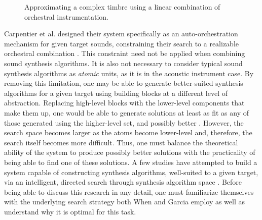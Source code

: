 \documentclass[a4paper,12pt]{report} 	%
\numberwithin{figure}{chapter}
\numberwithin{table}{chapter}
\numberwithin{equation}{chapter}
\begin{document}
\begin{flushleft}
\begin{figure}[h!]
\begin{center}
\caption[Searching for an Appropriate Linear Combination of Orchestral Instruments]{Approximating a complex timbre using a linear combination of orchestral instrumentation.}
\end{center}
\end{figure}
Carpentier et al. designed their system specifically as an auto-orchestration mechanism for given target sounds, constraining their search to a realizable orchestral combination \cite{Carpentier:2010fh}. This constraint need not be applied when combining sound synthesis algorithms. It is also not necessary to consider typical sound synthesis algorithms as \emph{atomic} units, as it is in the acoustic instrument case. By removing this limitation, one may be able to generate better-suited synthesis algorithms for a given target using building blocks at a different level of abstraction. Replacing high-level blocks with the lower-level components that make them up, one would be able to generate solutions at least as fit as any of those generated using the higher-level set, and possibly better \cite[p. 2]{Garcia:2000th}. However, the search space becomes larger as the atoms become lower-level and, therefore, the search itself becomes more difficult. Thus, one must balance the theoretical ability of the system to produce possibly better solutions with the practicality of being able to find one of these solutions. A few studies have attempted to build a system capable of constructing synthesis algorithms, well-suited to a given target, via an intelligent, directed search through synthesis algorithm space \cite{Wehn:1998bh, Garcia:2000th, Garcia:2002cq}. Before being able to discuss this research in any detail, one must familiarize themselves with the underlying search strategy both When and Garcia employ as well as understand why it is optimal for this task.


\end{flushleft}
\end{document}
